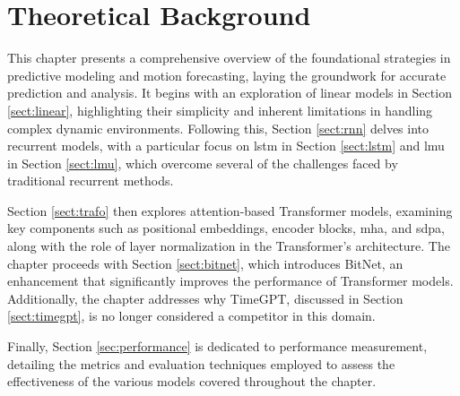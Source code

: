 \chapter{Theoretical Background}

This chapter presents a comprehensive overview of the foundational strategies in predictive modeling and motion forecasting, laying the groundwork for accurate prediction and analysis. It begins with an exploration of linear models in Section \ref{sect:linear}, highlighting their simplicity and inherent limitations in handling complex dynamic environments. Following this, Section \ref{sect:rnn} delves into recurrent models, with a particular focus on \gls{lstm} in Section \ref{sect:lstm} and \gls{lmu} in Section \ref{sect:lmu}, which overcome several of the challenges faced by traditional recurrent methods.

Section \ref{sect:trafo} then explores attention-based Transformer models, examining key components such as positional embeddings, encoder blocks, \gls{mha}, and \gls{sdpa}, along with the role of layer normalization in the Transformer's architecture. The chapter proceeds with Section \ref{sect:bitnet}, which introduces BitNet, an enhancement that significantly improves the performance of Transformer models. Additionally, the chapter addresses why TimeGPT, discussed in Section \ref{sect:timegpt}, is no longer considered a competitor in this domain.

Finally, Section \ref{sec:performance} is dedicated to performance measurement, detailing the metrics and evaluation techniques employed to assess the effectiveness of the various models covered throughout the chapter.


